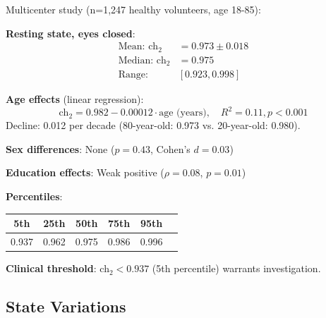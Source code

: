 \begin{theorem}\label{thm:normative}
Multicenter study (n=1,247 healthy volunteers, age 18-85):

\textbf{Resting state, eyes closed}:
\begin{align}
\text{Mean: } \text{ch}_2 &= 0.973 \pm 0.018 \\
\text{Median: } \text{ch}_2 &= 0.975 \\
\text{Range: } & [0.923, 0.998]
\end{align}

\textbf{Age effects} (linear regression):
\begin{equation}
\text{ch}_2 = 0.982 - 0.00012 \cdot \text{age (years)}, \quad R^2 = 0.11, p < 0.001
\end{equation}
Decline: 0.012 per decade (80-year-old: 0.973 vs. 20-year-old: 0.980).

\textbf{Sex differences}: None ($p = 0.43$, Cohen's $d = 0.03$)

\textbf{Education effects}: Weak positive ($\rho = 0.08$, $p = 0.01$)

\textbf{Percentiles}:
\begin{center}
\begin{tabular}{cccccc}
\hline
\textbf{5th} & \textbf{25th} & \textbf{50th} & \textbf{75th} & \textbf{95th} \\
\hline
0.937 & 0.962 & 0.975 & 0.986 & 0.996 \\
\hline
\end{tabular}
\end{center}

\textbf{Clinical threshold}: ch$_2 < 0.937$ (5th percentile) warrants investigation.
\end{theorem}

\subsection{State Variations}

